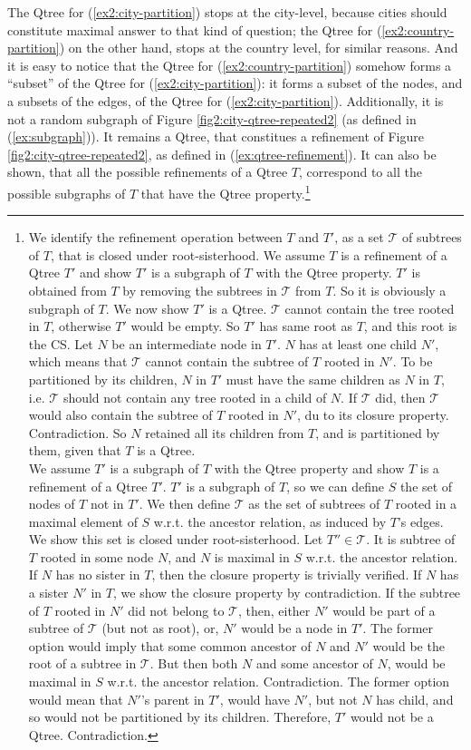 The Qtree for (\ref{ex2:city-partition}) stops at the city-level, because cities should constitute maximal answer to that kind of question; the Qtree for (\ref{ex2:country-partition}) on the other hand, stops at the country level, for similar reasons. And it is easy to notice that the Qtree for (\ref{ex2:country-partition}) somehow forms a ``subset'' of the Qtree for (\ref{ex2:city-partition}): it forms a subset of the nodes, and a subsets of the edges, of the Qtree for (\ref{ex2:city-partition}). Additionally, it is not a random subgraph of Figure \ref{fig2:city-qtree-repeated2} (as defined in (\ref{ex:subgraph})). It remains a Qtree, that constitues a refinement of Figure \ref{fig2:city-qtree-repeated2}, as defined in (\ref{ex:qtree-refinement}). It can also be shown, that all the possible refinements of a Qtree $T$, correspond to all the possible subgraphs of $T$ that have the Qtree property.\footnote{We identify the refinement operation between $T$ and $T'$, as a set $\mathcal{T}$ of subtrees of $T$, that is closed under root-sisterhood.
	We assume $T$ is a refinement of a Qtree $T'$ and show $T'$ is a subgraph of $T$ with the Qtree property. $T'$ is obtained from $T$ by removing the subtrees in $\mathcal{T}$ from $T$. So it is obviously a subgraph of $T$. We now show $T'$ is a Qtree. $\mathcal{T}$ cannot contain the tree rooted in $T$, otherwise $T'$ would be empty. So $T'$ has same root as $T$, and this root is the CS. Let $N$ be an intermediate node in $T'$. $N$ has at least one child $N'$, which means that $\mathcal{T}$ cannot contain the subtree of $T$ rooted in $N'$. To be partitioned by its children, $N$ in $T'$ must have the same children as $N$ in $T$, i.e. $\mathcal{T}$ should not contain any tree rooted in a child of $N$. If $\mathcal{T}$ did, then $\mathcal{T}$ would also contain the subtree of $T$ rooted in $N'$, du to its closure property. Contradiction. So $N$ retained all its children from $T$, and is partitioned by them, given that $T$ is a Qtree.\\
	We assume $T'$ is a subgraph of $T$ with the Qtree property and show $T$ is a refinement of a Qtree $T'$. $T'$ is a subgraph of $T$, so we can define $S$ the set of nodes of $T$ not in $T'$. We then define $\mathcal{T}$ as the set of subtrees of $T$ rooted in a maximal element of $S$ w.r.t. the ancestor relation, as induced by $T$'s edges. We show this set is closed under root-sisterhood. Let $T'' \in \mathcal{T}$. It is subtree of $T$ rooted in some node $N$, and $N$ is maximal in $S$ w.r.t. the ancestor relation. If $N$ has no sister in $T$, then the closure property is trivially verified. If $N$ has a sister $N'$ in $T$, we show the closure property by contradiction. If the subtree of $T$ rooted in $N'$ did not belong to $\mathcal{T}$, then, either $N'$ would be part of a subtree of $\mathcal{T}$ (but not as root), or, $N'$ would be a node in $T'$. The former option would imply that some common ancestor of $N$ and $N'$ would be the root of a subtree in $\mathcal{T}$. But then both $N$ and some ancestor of $N$, would be maximal in $S$ w.r.t. the ancestor relation. Contradiction. The former option would mean that $N'$'s parent in $T'$, would have $N'$, but not $N$ has child, and so would not be partitioned by its children. Therefore, $T'$ would not be a Qtree. Contradiction.}

